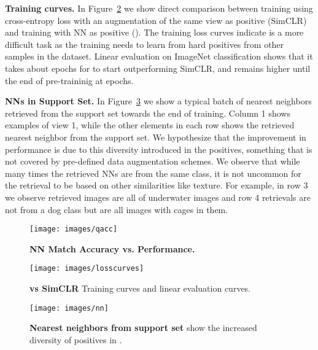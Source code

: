\noindent \textbf{Training curves.} In Figure~\ref{fig:losscurves} we show direct comparison between training using cross-entropy loss with an augmentation of the same view as positive (SimCLR) and training with NN as positive (\methodname). The training loss curves indicate \methodname is a more difficult task as the training needs to learn from hard positives from other samples in the dataset. Linear evaluation on ImageNet classification shows that it takes about  epochs for \methodname to start outperforming SimCLR, and remains higher until the end of pre-traininig at  epochs.



\noindent \textbf{NNs in Support Set.} In Figure~\ref{fig:nn} we show a typical batch of nearest neighbors retrieved from the support set towards the end of training.  Column 1 shows examples of view 1, while the other elements in each row shows the retrieved nearest neighbor from the support set. We hypothesize that the improvement in performance is due to this diversity introduced in the positives, something that is not covered by pre-defined data augmentation schemes. We observe that while many times the retrieved NNs are from the same class, it is not uncommon for the retrieval to be based on other similarities like texture. For example, in row 3 we observe retrieved images are all of underwater images and row 4 retrievals are not from a dog class but are all images with cages in them.  


\begin{figure}[t]
\begin{center}
   \texttt{[image: images/qacc]}
\end{center}
   \caption{\textbf{NN Match Accuracy vs. Performance.}}
\label{fig:queue_accuracy}
\end{figure}

\begin{figure}[t]
\begin{center}
   \texttt{[image: images/losscurves]}
\end{center}
   \caption{\textbf{\methodname  vs SimCLR} Training curves and linear evaluation curves.}
\label{fig:losscurves}
\end{figure}

\begin{figure}[t]
\begin{center}
   \texttt{[image: images/nn]}
\end{center}
\caption{\textbf{Nearest neighbors from support set} show the increased diversity of positives in \methodname.}
\label{fig:nn}
\end{figure}
